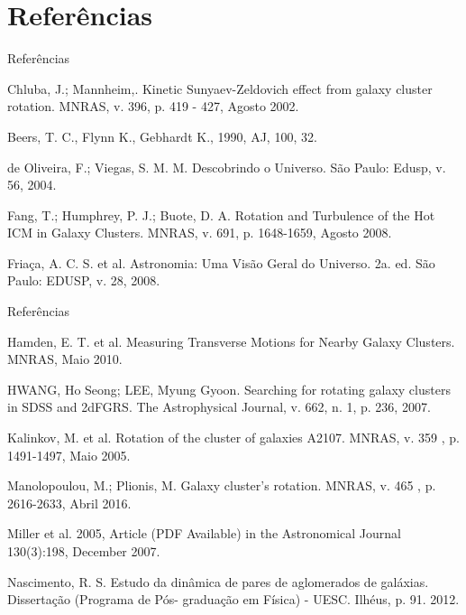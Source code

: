 \documentclass[xcolor=dvipsnames,10pt]{beamer}
\begin{document}
\section{Referências}
\begin{frame}{Referências}
  \begin{thebibliography}{9}
  \fontsize{8}{0}\selectfont
  Chluba, J.; Mannheim,. Kinetic Sunyaev-Zeldovich effect from galaxy cluster rotation. MNRAS, v. 396, p. 419 -
  427, Agosto 2002.

  Beers, T. C., Flynn K., Gebhardt K., 1990, AJ, 100, 32. 

  de Oliveira, F.; Viegas, S. M. M. Descobrindo o Universo. São Paulo: Edusp, v. 56, 2004.

  Fang, T.; Humphrey, P. J.; Buote, D. A. Rotation and Turbulence of the Hot ICM in Galaxy Clusters. MNRAS,
  v. 691, p. 1648-1659, Agosto 2008.

  Friaça, A. C. S. et al. Astronomia: Uma Visão Geral do Universo. 2a. ed. São Paulo: EDUSP, v. 28, 2008.

  \end{thebibliography}
\end{frame}

\begin{frame}{Referências}
  \begin{thebibliography}{9}
  \fontsize{8}{0}\selectfont
  Hamden, E. T. et al. Measuring Transverse Motions for Nearby Galaxy Clusters. MNRAS, Maio 2010.

  HWANG, Ho Seong; LEE, Myung Gyoon. Searching for rotating galaxy clusters in SDSS and 2dFGRS. {The Astrophysical Journal}, v. 662, n. 1, p. 236, 2007.

  Kalinkov, M. et al. Rotation of the cluster of galaxies A2107. MNRAS, v. 359 , p. 1491-1497, Maio 2005.

  Manolopoulou, M.; Plionis, M. Galaxy cluster's rotation. MNRAS, v. 465 , p. 2616-2633, Abril 2016.

  Miller et al. 2005, Article (PDF Available) in the Astronomical Journal 130(3):198, December 2007. 

  Nascimento, R. S. Estudo da dinâmica de pares de aglomerados de galáxias. Dissertação (Programa de Pós-
  graduação em Física) - UESC. Ilhéus, p. 91. 2012.
  \end{thebibliography}
\end{frame}
\end{document}
